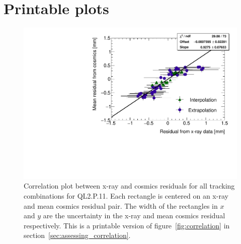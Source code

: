 
\chapter[Printable plots]{Printable plots}
\label{appendix:print}

\begin{figure}
    \centering
    \includegraphics[width = \textwidth]{figures/figure_QL2P11_3100V_2021-08-05_QL2P11_local_cosmic_and_xray_data_correlation_plot_printable.pdf}
    \caption{Correlation plot between x-ray and cosmics residuals for all tracking combinations for QL2.P.11. Each rectangle is centered on an x-ray and mean cosmics residual pair. The width of the rectangles in $x$ and $y$ are the uncertainty in the x-ray and mean cosmics residual respectively. This is a printable version of figure~\ref{fig:correlation} in section~\ref{sec:assessing_correlation}.}
    \label{fig:correlation_print}
\end{figure}

